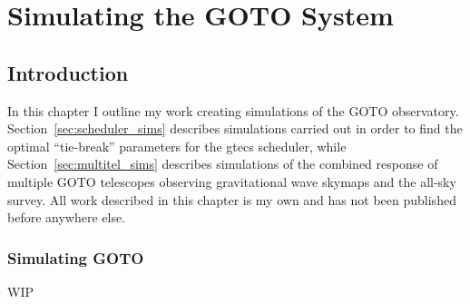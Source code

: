 \chapter{Simulating the GOTO System}
\label{chap:sims}
\chaptoc{}


\newpage
\section{Introduction}
\label{sec:sims_intro}
\begin{colsection}


\begin{colsection}

In this chapter I outline my work creating simulations of the GOTO observatory. Section~\ref{sec:scheduler_sims} describes simulations carried out in order to find the optimal ``tie-break'' parameters for the \gls{gtecs} scheduler, while Section~\ref{sec:multitel_sims} describes simulations of the combined response of multiple GOTO telescopes observing gravitational wave skymaps and the all-sky survey. All work described in this chapter is my own and has not been published before anywhere else.

\end{colsection}


\subsection{Simulating GOTO}
\label{sec:goto_sims}
\begin{colsection}

WIP

\end{colsection}


\end{colsection}


\newpage
